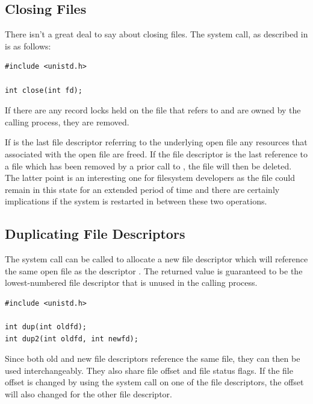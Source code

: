 
\subsection{Closing Files}

There isn't a great deal to say about closing files. The system call, as described in  is as follows:

\begin{lstlisting}
#include <unistd.h>

int close(int fd);
\end{lstlisting}

\noindent
If there are any record locks held on the file that  refers to and are owned by the calling process, they are removed.

If  is the last file descriptor referring to the underlying open file any resources that associated with the open file are freed. If the file descriptor is the last reference to a file which has been removed by a prior call to , the file will then be deleted. The latter point is an interesting one for filesystem developers as the file could remain in this state for an extended period of time and there are certainly implications if the system is restarted in between these two operations.


\subsection{Duplicating File Descriptors}

The  system call can be called to allocate a new file descriptor which will reference the same open file as the descriptor . The returned value is guaranteed to be the lowest-numbered file descriptor that is unused in the calling process.

\begin{lstlisting}
#include <unistd.h>

int dup(int oldfd);
int dup2(int oldfd, int newfd);
\end{lstlisting}

\noindent
Since both old and new file descriptors reference the same file, they can then be used interchangeably.  They also share file offset and file status flags. If the file offset is changed by using the  system call on one of the file descriptors, the offset will also changed for the other file descriptor.

